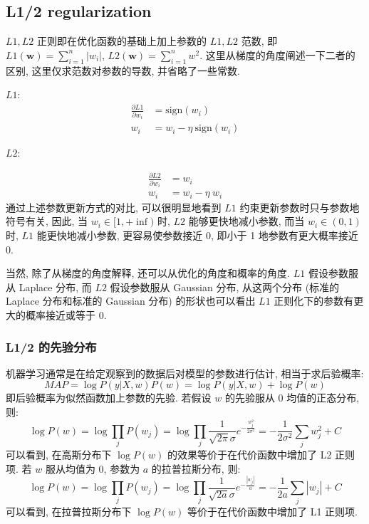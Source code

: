 
\subsection{L1/2 regularization}
$L1, L2$ 正则即在优化函数的基础上加上参数的 $L1, L2$ 范数, 即 $L1(\boldsymbol{w}) = \sum_{i=1}^{n} |w_i|$, $L2(\boldsymbol{w}) = \sum_{i=1}^{n} w^2$. 这里从梯度的角度阐述一下二者的区别, 这里仅求范数对参数的导数, 并省略了一些常数. 

$L1$: 
$$
\begin{aligned}
	\frac{\partial L1}{\partial w_i} &=  \text{sign}(w_i) \\
	w_i &= w_i - \eta\ \text{sign}(w_i)	
\end{aligned}
$$

$L2$: 

$$
\begin{aligned}
	\frac{\partial L2}{\partial w_i} &=  w_i \\
	w_i &= w_i - \eta\ w_i
\end{aligned}
$$
通过上述参数更新方式的对比, 可以很明显地看到 $L1$ 约束更新参数时只与参数地符号有关, 因此, 当 $w_i \in [1, +\inf)$ 时, $L2$ 能够更快地减小参数, 而当 $w_i \in (0, 1)$ 时, $L1$ 能更快地减小参数, 更容易使参数接近 0, 即小于 1 地参数有更大概率接近 0. 

当然, 除了从梯度的角度解释, 还可以从优化的角度和概率的角度. $L1$ 假设参数服从 Laplace 分布, 而 $L2$ 假设参数服从 Gaussian 分布, 从这两个分布 (标准的 Laplace 分布和标准的 Gaussian 分布) 的形状也可以看出 $L1$ 正则化下的参数有更大的概率接近或等于 0. 

\subsubsection{L1/2 的先验分布}
机器学习通常是在给定观察到的数据后对模型的参数进行估计, 相当于求后验概率: 
$$
MAP = \log P(y | X, w) P(w) = \log P(y | X, w) + \log P(w)
$$
即后验概率为似然函数加上参数的先验. 若假设 $w$ 的先验服从 0 均值的正态分布, 则: 
$$
\log P(w) = \log \prod_{j} P(w_j) = \log \prod_{j} \frac{1}{\sqrt{2 \pi } \sigma} e ^ {-\frac{w_j^2}{2 \sigma^2}} =-\frac{1}{2 \sigma^2} \sum_j w_j^2 + C
$$
可以看到, 在高斯分布下 $\log P(w)$ 的效果等价于在代价函数中增加了 L2 正则项. 若 $w$ 服从均值为 0, 参数为 $a$ 的拉普拉斯分布, 则: 
$$
\log P(w) = \log \prod_{j} P(w_j) = \log \prod_{j} \frac{1}{\sqrt{2 a} \sigma} e^{-\frac{|w_j|}{a}} = -\frac{1}{2a} \sum_j |w_j| + C
$$
可以看到, 在拉普拉斯分布下 $\log P(w)$ 等价于在代价函数中增加了 L1 正则项. 

